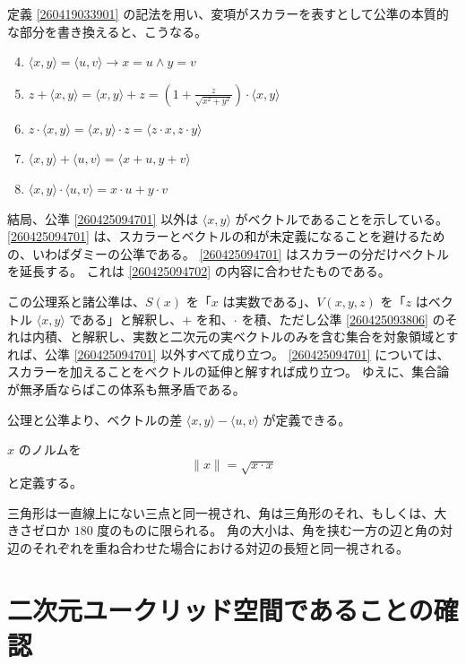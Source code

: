 定義 \ref{260419033901} の記法を用い、変項がスカラーを表すとして公準の本質的な部分を書き換えると、こうなる。

\begin{enumerate}
  \setcounter{enumi}{3}
  \item \(\langle x,y\rangle=\langle u,v\rangle\rightarrow x=u\land y=v\)
  \item\label{260425094701} \(\displaystyle z+\langle x,y\rangle=\langle x,y\rangle+z=\left(1+\frac{z}{\sqrt{x^2+y^2}}\right)\cdot\langle x,y\rangle\)
  \item\label{260425094702} \(z\cdot\langle x,y\rangle=\langle x,y\rangle\cdot z=\langle z\cdot x,z\cdot y\rangle\)
  \item \(\langle x,y\rangle+\langle u,v\rangle=\langle x+u,y+v\rangle\)
  \item\label{260425093806} \(\langle x,y\rangle\cdot\langle u,v\rangle=x\cdot u+y\cdot v\)
\end{enumerate}

結局、公準 \ref{260425094701} 以外は \(\langle x,y\rangle\) がベクトルであることを示している。
\ref{260425094701} は、スカラーとベクトルの和が未定義になることを避けるための、いわばダミーの公準である。
\ref{260425094701} はスカラーの分だけベクトルを延長する。
これは \ref{260425094702} の内容に合わせたものである。

この公理系と諸公準は、\(S(x)\) を「\(x\) は実数である」、\(V(x,y,z)\) を「\(z\) はベクトル \(\langle x,y\rangle\) である」と解釈し、\(+\) を和、\(\cdot\) を積、ただし公準 \ref{260425093806} のそれは内積、と解釈し、実数と二次元の実ベクトルのみを含む集合を対象領域とすれば、公準 \ref{260425094701} 以外すべて成り立つ。
\ref{260425094701} については、スカラーを加えることをベクトルの延伸と解すれば成り立つ。
ゆえに、集合論が無矛盾ならばこの体系も無矛盾である。

公理と公準より、ベクトルの差 \(\langle x,y\rangle-\langle u,v\rangle\) が定義できる。


\begin{dfn}
  \(x\) のノルムを
  \[\|x\|=\sqrt{x\cdot x}\]
  と定義する。
\end{dfn}

三角形は一直線上にない三点と同一視され、角は三角形のそれ、もしくは、大きさゼロか \(180\) 度のものに限られる。
角の大小は、角を挟む一方の辺と角の対辺のそれぞれを重ね合わせた場合における対辺の長短と同一視される。


\section{二次元ユークリッド空間であることの確認}

